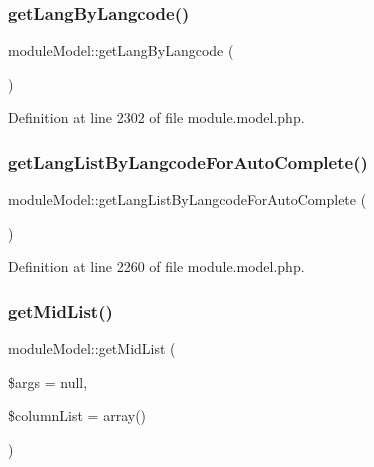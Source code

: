 \subsubsection{\texorpdfstring{get\+Lang\+By\+Langcode()}{getLangByLangcode()}}
{\footnotesize\ttfamily module\+Model\+::get\+Lang\+By\+Langcode (\begin{DoxyParamCaption}{ }\end{DoxyParamCaption})}



Definition at line 2302 of file module.\+model.\+php.

\hypertarget{classmoduleModel_aa0e34c0fdc868595793b10b6b4534c74}{}\label{classmoduleModel_aa0e34c0fdc868595793b10b6b4534c74} 
\subsubsection{\texorpdfstring{get\+Lang\+List\+By\+Langcode\+For\+Auto\+Complete()}{getLangListByLangcodeForAutoComplete()}}
{\footnotesize\ttfamily module\+Model\+::get\+Lang\+List\+By\+Langcode\+For\+Auto\+Complete (\begin{DoxyParamCaption}{ }\end{DoxyParamCaption})}



Definition at line 2260 of file module.\+model.\+php.

\hypertarget{classmoduleModel_a455828df6cdf405ba9b77d242faf8651}{}\label{classmoduleModel_a455828df6cdf405ba9b77d242faf8651} 
\subsubsection{\texorpdfstring{get\+Mid\+List()}{getMidList()}}
{\footnotesize\ttfamily module\+Model\+::get\+Mid\+List (\begin{DoxyParamCaption}\item[{}]{\$args = {\ttfamily null},  }\item[{}]{\$column\+List = {\ttfamily array()} }\end{DoxyParamCaption})}



